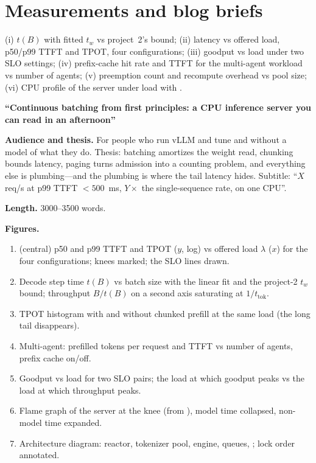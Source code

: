 \section{Measurements and blog briefs}

(i) $t(B)$ with fitted $t_w$ vs project~2's bound; (ii) latency vs offered load, p50/p99 TTFT and TPOT, four configurations; (iii) goodput vs load under two SLO settings; (iv) prefix-cache hit rate and TTFT for the multi-agent workload vs number of agents; (v) preemption count and recompute overhead vs pool size; (vi) CPU profile of the server under load with .

\begin{blogbox}
 \textbf{``Continuous batching from first principles: a CPU inference server you can read in an afternoon''}

\textbf{Audience and thesis.} For people who run vLLM and tune  and  without a model of what they do. Thesis: batching amortizes the weight read, chunking bounds latency, paging turns admission into a counting problem, and everything else is plumbing---and the plumbing is where the tail latency hides. Subtitle: ``$X$ req/s at p99 TTFT $< 500$~ms, $Y\times$ the single-sequence rate, on one CPU''.

\textbf{Length.} 3000--3500 words.

\textbf{Figures.}
\begin{enumerate}
  \item {} (central) p50 and p99 TTFT and TPOT ($y$, log) vs offered load $\lambda$ ($x$) for the four configurations; knees marked; the SLO lines drawn.
  \item {} Decode step time $t(B)$ vs batch size with the linear fit and the project-2 $t_w$ bound; throughput $B/t(B)$ on a second axis saturating at $1/t_{\text{tok}}$.
  \item {} TPOT histogram with and without chunked prefill at the same load (the long tail disappears).
  \item {} Multi-agent: prefilled tokens per request and TTFT vs number of agents, prefix cache on/off.
  \item {} Goodput vs load for two SLO pairs; the load at which goodput peaks vs the load at which throughput peaks.
  \item {} Flame graph of the server at the knee (from ), model time collapsed, non-model time expanded.
  \item {} Architecture diagram: reactor, tokenizer pool, engine, queues, ; lock order annotated.
\end{enumerate}


\end{blogbox}
